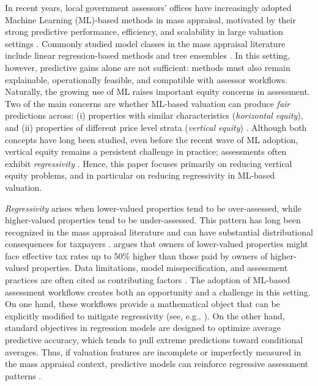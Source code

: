 \documentclass[12pt, draft]{article}
\theoremstyle{plain}
\theoremstyle{definition}
\newcommand{\1}{\mathbf{1}}
\begin{document}
In recent years, local government assessors' offices have increasingly adopted Machine Learning (ML)-based methods in mass appraisal, motivated by their strong predictive performance, efficiency, and scalability in large valuation settings \cite{IAAOAITaskForce2022,BidansetRakow2022,Rootetal2023}. Commonly studied model classes in the mass appraisal literature include linear regression-based methods and tree ensembles \cite{Rootetal2023,Ostrikova2024,Sevgen2024100111}. In this setting, however, predictive gains alone are not sufficient: methods must also remain explainable, operationally feasible, and compatible with assessor workflows. Naturally, the growing use of ML raises important equity concerns in assessment. Two of the main concerns are whether ML-based valuation can produce \textit{fair} predictions across: (i) properties with similar characteristics (\textit{horizontal equity}), and (ii) properties of different price level strata (\textit{vertical equity}) \cite{Quintos2014,10578d49-78f8-3ef9-8277-9b6add2bd071,cornia2006property}. Although both concepts have long been studied, even before the recent wave of ML adoption, vertical equity remains a persistent challenge in practice; assessments often exhibit \textit{regressivity} \cite{McMillen2020,IAAO2023VerticalReview,McMillenSingh2023}. Hence, this paper focuses primarily on reducing vertical equity problems, and in particular on reducing regressivity in ML-based valuation.

\textit{Regressivity} arises when lower-valued properties tend to be over-assessed, while higher-valued properties tend to be under-assessed. This pattern has long been recognized in the mass appraisal literature and can have substantial distributional consequences for taxpayers \cite{McMillen2020}. \textcite{amornsiripanitch2020why} argues that owners of
lower-valued properties might face effective tax rates up to 50\% higher than those paid by owners of higher-valued properties. Data limitations, model misspecification, and assessment practices are often cited as contributing factors \cite{Berry2021}. The adoption of ML-based assessment workflows creates both an opportunity and a challenge in this setting. On one hand, these workflows provide a mathematical object that can be explicitly modified to mitigate regressivity (see, e.g., \textcite{CandoganHanLu2023}). On the other hand, standard objectives in regression models are designed to optimize average predictive accuracy, which tends to pull extreme predictions toward conditional averages. Thus, if valuation features are incomplete or imperfectly measured in the mass appraisal context, predictive models can reinforce regressive assessment patterns \cite{amornsiripanitch2020why, CandoganHanLu2023}.
\end{document}
